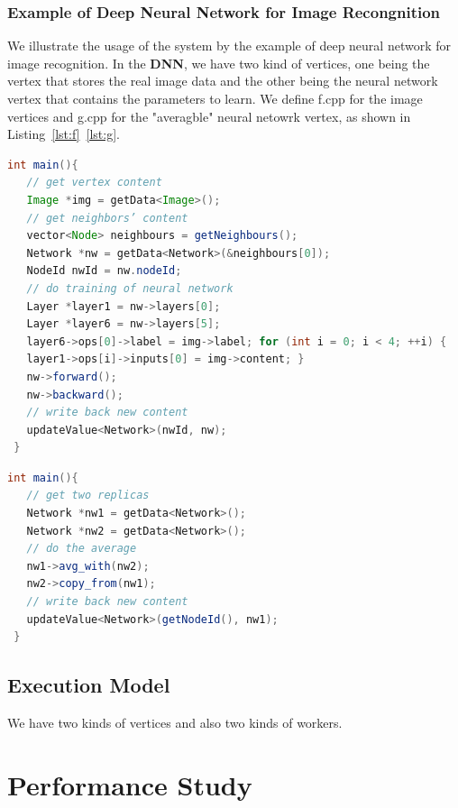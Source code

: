\documentclass[11pt]{article}
\begin{document}
\subsubsection{Example of Deep Neural Network for Image Recongnition}
We illustrate the usage of the system by the example of deep	neural	network	
for image recognition. In the \textbf{DNN}, we have two kind of vertices, one 
being the vertex that stores the real image data and the other being the neural 
network vertex that contains the parameters to learn. 
We define \textsf{f.cpp} for the image vertices and \textsf{g.cpp} for the 
"averagble" neural netowrk vertex, as shown in Listing~\ref{lst:f}~\ref{lst:g}.
\begin{lstlisting}[language=java,basicstyle={\ttfamily\small},caption={f.cpp},label={lst:f},frame=single]
 int main(){ 
   // get vertex content
   Image *img = getData<Image>();
   // get neighbors’ content 
   vector<Node> neighbours = getNeighbours(); 
   Network *nw = getData<Network>(&neighbours[0]); 
   NodeId nwId = nw.nodeId;
   // do training of neural network
   Layer *layer1 = nw->layers[0];
   Layer *layer6 = nw->layers[5];
   layer6->ops[0]->label = img->label; for (int i = 0; i < 4; ++i) {
   layer1->ops[i]->inputs[0] = img->content; }
   nw->forward();
   nw->backward();
   // write back new content 
   updateValue<Network>(nwId, nw);
 }
\end{lstlisting}
\begin{lstlisting}[language=java,basicstyle={\ttfamily\small},caption={g.cpp},label={lst:g},frame=single]
 int main(){ 
   // get two replicas 
   Network *nw1 = getData<Network>(); 
   Network *nw2 = getData<Network>();
   // do the average 
   nw1->avg_with(nw2); 
   nw2->copy_from(nw1);
   // write back new content 
   updateValue<Network>(getNodeId(), nw1);
 } 
\end{lstlisting}

\subsection{Execution Model}
We have two kinds of vertices and also two kinds of workers. 
\section{Performance Study}



\end{document}
